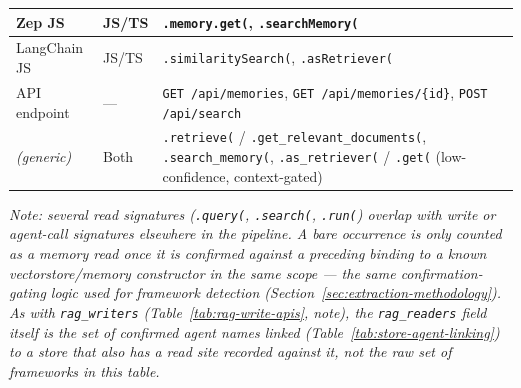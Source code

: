 {\begin{longtable}{@{}p{}p{}p{}@{}}
Zep JS & JS/TS & \texttt{.memory.get(}, \texttt{.searchMemory(} \\ \midrule
LangChain JS & JS/TS & \texttt{.similaritySearch(}, \texttt{.asRetriever(} \\ \midrule
API endpoint & --- & \texttt{GET /api/memories}, \texttt{GET /api/memories/\{id\}}, \texttt{POST /api/search} \\ \midrule
\textit{(generic)} & Both & \texttt{.retrieve(} / \texttt{.get\_relevant\_documents(}, \texttt{.search\_memory(}, \texttt{.as\_retriever(} / \texttt{.get(} (low-confidence, context-gated) \\ \midrule

\end{longtable}
}
\textit{Note: several read signatures (\texttt{.query(}, \texttt{.search(}, \texttt{.run(}) overlap with write or agent-call signatures elsewhere in the pipeline. A bare occurrence is only counted as a memory read once it is confirmed against a preceding binding to a known vectorstore/memory constructor in the same scope --- the same confirmation-gating logic used for framework detection (Section~\ref{sec:extraction-methodology}). As with \texttt{rag\_writers} (Table~\ref{tab:rag-write-apis}, note), the \texttt{rag\_readers} field itself is the set of confirmed agent names linked (Table~\ref{tab:store-agent-linking}) to a store that also has a read site recorded against it, not the raw set of frameworks in this table.}


